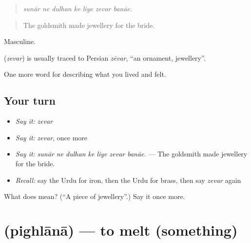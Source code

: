 \begin{quote}
      
\end{quote}

\begin{quote}
\emph{sunār ne dulhan ke liye zevar banāe.}
\end{quote}

\begin{quote}
The goldsmith made jewellery for the bride.
\end{quote}

Masculine.

\begin{cousinweb}
\textbf{} (\emph{zevar}) is usually traced to Persian \emph{zēvar}, \textquotedblleft{}an ornament, jewellery\textquotedblright{}.
\end{cousinweb}

\begin{grammarlens}[title={What you've built}]
One more word for describing what you lived and felt.
\end{grammarlens}

\subsection*{Your turn}
\begin{itemize}
\raggedright
  \item \emph{Say it:} \emph{zevar}
  \item \emph{Say it:} \emph{zevar}, once more
  \item \emph{Say it:} \emph{sunār ne dulhan ke liye zevar banāe.} — The goldsmith made jewellery for the bride.
  \item \emph{Recall:} say the Urdu for iron, then the Urdu for brass, then say \emph{zevar} again
\end{itemize}

\begin{tcolorbox}[breakable,colback=teal!4,colframe=teal!35!black,title={Before you move on}]
What does  mean? (\textquotedblleft{}A piece of jewellery\textquotedblright{}.) Say it once more.
\end{tcolorbox}
\section[\texorpdfstring{\ur{پگھلانا} (pighlānā)}{پگھلانا (pighlānā)}]{ (pighlānā) — to melt (something)}

